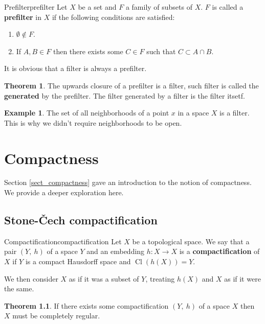\documentclass[a4paper]{book}
\theoremstyle{definition}
\newtheorem{theorem}{Theorem}[section]
\theoremstyle{ejemplo}
\newtheorem{example}{Example}[section]
\theoremstyle{demostracion}
\DeclareMathOperator{\closure}{Cl}
\begin{document}
\begin{define}{Prefilter}{prefilter}
	Let $X$ be a set and $F$ a family of subsets of $X$. $F$ is called a \textbf{prefilter} in $X$ if the following conditions are satisfied:
	\begin{enumerate}
		\item
		$\emptyset \not \in F$.
		\item
		If $A,B \in F$ then there exists some $C \in F$ such that $C \subset A \cap B$.
	\end{enumerate}
\end{define}

It is obvious that a filter is always a prefilter.

\begin{theorem}
	The upwards closure of a prefilter is a filter, such filter is called the \textbf{generated} by the prefilter. The filter generated by a filter is the filter itsetf.
\end{theorem}

\begin{example}
	The set of all neighborhoods of a point $x$ in a space $X$ is a filter. This is why we didn't require neighborhoods to be open.
\end{example}

\chapter{Compactness}
Section \eqref{sect_compactness} gave an introduction to the notion of compactness. We provide a deeper exploration here.

\section{Stone-Čech compactification}
\begin{define}{Compactification}{compactification}
	Let $X$ be a topological space. We say that a pair $(Y,\ h)$ of a space $Y$ and an embedding $h: X \rightarrow X$ is a \textbf{compactification} of $X$ if $Y$ is a compact Hausdorff space and $\closure(h(X)) = Y$.
\end{define}
We then consider $X$ as if it was a subset of $Y$, treating $h(X)$ and $X$ as if it were the same.


\begin{theorem}
	If there exists some compactification $(Y,\ h)$ of a space $X$ then $X$ must be completely regular.
\end{theorem}
\end{document}
